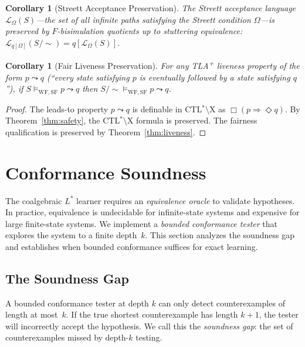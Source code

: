 \documentclass[11pt]{article}
\newtheorem{corollary}[theorem]{Corollary}
\newcommand{\WF}{\ensuremath{\mathrm{WF}}}
\newcommand{\SF}{\ensuremath{\mathrm{SF}}}
\newcommand{\TLAplus}{TLA\textsuperscript{+}}
\begin{document}
\begin{corollary}[Streett Acceptance Preservation]
\label{cor:streett}
The Streett acceptance language $\mathcal{L}_\Omega(S)$---the set of all
infinite paths satisfying the Streett condition $\Omega$---is preserved
by $F$-bisimulation quotients up to stuttering equivalence:
$\mathcal{L}_{q[\Omega]}(S/{\sim}) = q[\mathcal{L}_\Omega(S)]$.
\end{corollary}

\begin{corollary}[Fair Liveness Preservation]
\label{cor:fair-live}
For any \TLAplus{} liveness property of the form $p \leadsto q$
(``every state satisfying $p$ is eventually followed by a state
satisfying $q$''), if $S \models_{\WF,\SF} p \leadsto q$
then $S/{\sim} \models_{\WF,\SF} p \leadsto q$.
\end{corollary}

\begin{proof}
The leads-to property $p \leadsto q$ is definable in CTL$^*$$\setminus$X
as $\Box(p \Rightarrow \Diamond q)$.
By Theorem~\ref{thm:safety}, the CTL$^*$$\setminus$X formula is preserved.
The fairness qualification is preserved by Theorem~\ref{thm:liveness}.
\end{proof}


\section{Conformance Soundness}
\label{sec:conformance}

The coalgebraic $L^*$ learner requires an \emph{equivalence oracle} to
validate hypotheses.
In practice, equivalence is undecidable for infinite-state systems and
expensive for large finite-state systems.
We implement a \emph{bounded conformance tester} that explores the system
to a finite depth~$k$.
This section analyzes the soundness gap and establishes when bounded
conformance suffices for exact learning.

\subsection{The Soundness Gap}

A bounded conformance tester at depth $k$ can only detect counterexamples
of length at most~$k$.
If the true shortest counterexample has length $k + 1$, the tester will
incorrectly accept the hypothesis.
We call this the \emph{soundness gap}: the set of counterexamples
missed by depth-$k$ testing.
\end{document}
